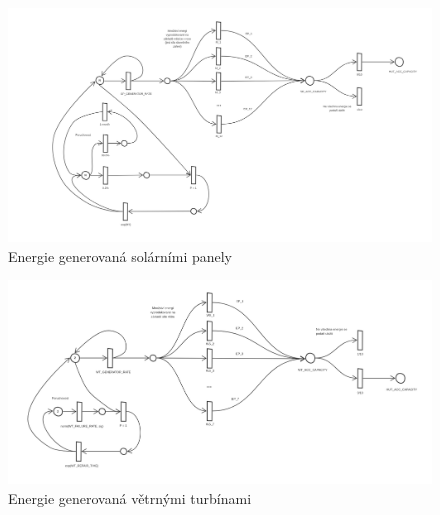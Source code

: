 \begin{figure}[H]
    \centering
    \includegraphics[width=.99\textwidth]{images/petri_net_solar_energy.png}\hfill
    \caption{Energie generovaná solárními panely}
    \label{fig:petri_net_solar_energy}
\end{figure}

\begin{figure}[H]
    \centering
    \includegraphics[width=.99\textwidth]{images/petri_net_wind_energy.png}\hfill
    \caption{Energie generovaná větrnými turbínami}
    \label{fig:petri_net_wind_energy}
\end{figure}
